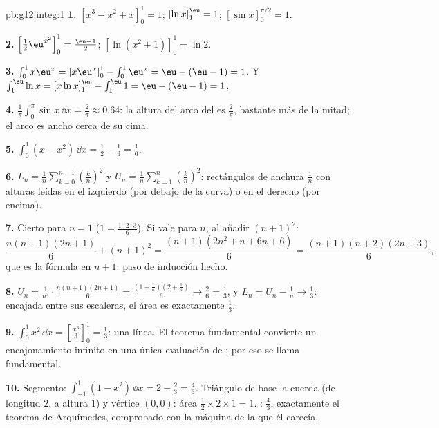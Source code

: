 \begin{solution}{pb:g12:integ:1}
\textbf{1.} $\left[x^3 - x^2 + x\right]_0^1 = 1$; \quad
$\left[\ln x\right]_1^{\eu} = 1$; \quad
$\left[\sin x\right]_0^{\pi/2} = 1$.

\textbf{2.} $\left[\frac12 \eu^{x^2}\right]_0^1 = \frac{\eu - 1}{2}$; \quad
$\left[\ln(x^2 + 1)\right]_0^1 = \ln 2$.

\textbf{3.} $\int_0^1 x\eu^x = \left[x\eu^x\right]_0^1 - \int_0^1 \eu^x =
\eu - (\eu - 1) = 1$. Y
$\int_1^{\eu} \ln x = \left[x\ln x\right]_1^{\eu} - \int_1^{\eu} 1 =
\eu - (\eu - 1) = 1$.

\textbf{4.} $\frac{1}{\pi}\int_0^\pi \sin x\,\dd x = \frac{2}{\pi} \approx
0.64$: la altura  del arco del  es $\frac2\pi$, bastante más de la
mitad; el arco es ancho cerca de su cima.

\textbf{5.} $\int_0^1 (x - x^2)\,\dd x = \frac12 - \frac13 = \frac16$.

\textbf{6.} $L_n = \frac1n \sum_{k=0}^{n-1} \left(\frac kn\right)^2$ y
$U_n = \frac1n \sum_{k=1}^{n} \left(\frac kn\right)^2$: rectángulos de
anchura $\frac1n$ con alturas leídas en el  izquierdo (por debajo de
la curva) o en el derecho (por encima).

\textbf{7.} Cierto para $n = 1$ ($1 = \frac{1 \cdot 2 \cdot 3}{6}$). Si
vale para $n$, al añadir $(n+1)^2$:
\[
\frac{n(n+1)(2n+1)}{6} + (n+1)^2
= \frac{(n+1)\left(2n^2 + n + 6n + 6\right)}{6}
= \frac{(n+1)(n+2)(2n+3)}{6},
\]
que es la fórmula en $n + 1$: paso de inducción hecho.

\textbf{8.} $U_n = \frac{1}{n^3} \cdot \frac{n(n+1)(2n+1)}{6} =
\frac{(1 + \frac1n)(2 + \frac1n)}{6} \to \frac26 = \frac13$, y
$L_n = U_n - \frac1n \to \frac13$: encajada entre sus escaleras, el área es
exactamente $\frac13$.

\textbf{9.} $\int_0^1 x^2\,\dd x = \left[\frac{x^3}{3}\right]_0^1 =
\frac13$: una línea. El teorema fundamental convierte un encajonamiento
infinito en una única evaluación de ; por eso se llama
fundamental.

\textbf{10.} Segmento: $\int_{-1}^{1}(1 - x^2)\,\dd x = 2 - \frac23 =
\frac43$. Triángulo de base la cuerda (de longitud $2$, a altura $1$) y
vértice $(0,0)$: área $\frac12 \times 2 \times 1 = 1$. : $\frac43$,
exactamente el teorema de Arquímedes, comprobado con la máquina de la que
él carecía.


\end{solution}
